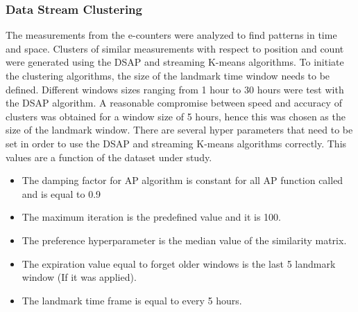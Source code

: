 \subsubsection{Data Stream Clustering}
The measurements from the e-counters were analyzed to find patterns in time and space. Clusters of similar measurements with respect to position and count were generated using the DSAP and streaming K-means algorithms. To initiate the clustering algorithms, the size of the landmark time window needs to be defined. Different windows sizes ranging from 1 hour to 30 hours were test with the DSAP algorithm. A reasonable compromise between speed and accuracy of clusters was obtained for a window size of 5 hours, hence this was chosen as the size of the landmark window.%
There are several hyper parameters that need to be set in order to use the DSAP and streaming K-means algorithms correctly. This values are a function of the dataset under study. 
\begin{itemize}
    \item The damping factor for AP algorithm is constant for all AP function called and is equal to 0.9
    \item The maximum iteration is the predefined value and it is 100.
    \item The preference hyperparameter is the median value of the similarity matrix.
    \item The expiration value equal to forget older windows is the last 5 landmark window (If it was applied). 
    \item The landmark time frame is equal to every 5 hours.
\end{itemize}





